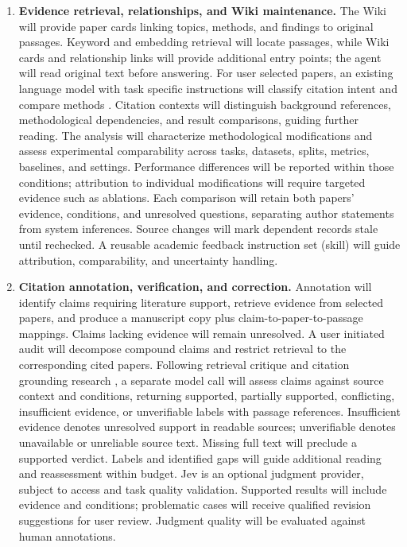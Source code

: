 \documentclass{article}
\begin{document}
\begin{enumerate}
\item \textbf{Evidence retrieval, relationships, and Wiki maintenance.} The Wiki will provide paper cards linking topics, methods, and findings to original passages. Keyword and embedding retrieval will locate passages, while Wiki cards and relationship links will provide additional entry points; the agent will read original text before answering. For user selected papers, an existing language model with task specific instructions will classify citation intent and compare methods \cite{scicite,cito}. Citation contexts will distinguish background references, methodological dependencies, and result comparisons, guiding further reading. The analysis will characterize methodological modifications and assess experimental comparability across tasks, datasets, splits, metrics, baselines, and settings. Performance differences will be reported within those conditions; attribution to individual modifications will require targeted evidence such as ablations. Each comparison will retain both papers' evidence, conditions, and unresolved questions, separating author statements from system inferences. Source changes will mark dependent records stale until rechecked. A reusable academic feedback instruction set (skill) will guide attribution, comparability, and uncertainty handling.

\item \textbf{Citation annotation, verification, and correction.} Annotation will identify claims requiring literature support, retrieve evidence from selected papers, and produce a manuscript copy plus claim-to-paper-to-passage mappings. Claims lacking evidence will remain unresolved. A user initiated audit will decompose compound claims and restrict retrieval to the corresponding cited papers. Following retrieval critique and citation grounding research \cite{selfrag,alce}, a separate model call will assess claims against source context and conditions, returning supported, partially supported, conflicting, insufficient evidence, or unverifiable labels with passage references. Insufficient evidence denotes unresolved support in readable sources; unverifiable denotes unavailable or unreliable source text. Missing full text will preclude a supported verdict. Labels and identified gaps will guide additional reading and reassessment within budget. Jev \cite{jev} is an optional judgment provider, subject to access and task quality validation. Supported results will include evidence and conditions; problematic cases will receive qualified revision suggestions for user review. Judgment quality will be evaluated against human annotations.


\end{enumerate}
\end{document}
